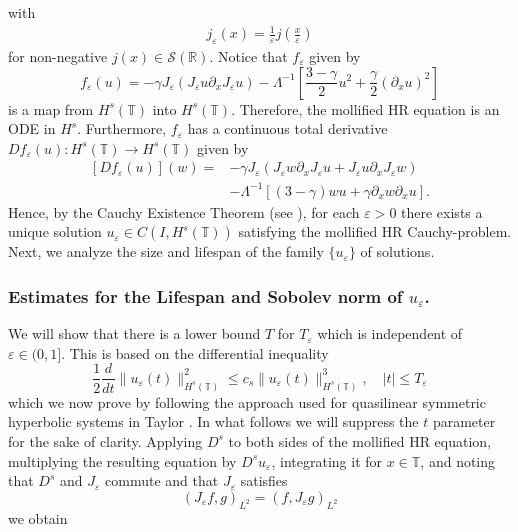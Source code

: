 \documentclass{beamer}
\newcommand{\rr}{\mathbb{R}}
\newcommand{\p}{\partial}
\newcommand{\ci}{\mathbb{T}}
\newcommand{\ee}{\varepsilon}
\begin{document}
\begin{frame}
with 
%
\begin{equation*}
\begin{split}
j_\ee(x) = \frac{1}{\ee}j\left( \frac{x}{\ee} \right)
\end{split}
\end{equation*}
%
for non-negative $j(x) \in
\mathcal{S}(\rr)$. Notice that  $f_\ee$ given by 
%
%
\begin{equation*}
\label{f_ep}
f_{\ee}(u) = - \gamma J_\ee(J_\varepsilon u \partial_x J_\varepsilon u)
- \Lambda^{-1} \left
[\frac{3-\gamma}{2}u^2 + \frac{\gamma}{2}(\p_x u)^2 \right ]
\end{equation*}
%
is a map from $H^s(\ci)$  into $H^s(\ci)$. 
Therefore, the mollified HR equation 
is an ODE in $H^s$.
%
%
Furthermore, $f_\ee$ has a continuous total derivative $D f_\ee (u): 
H^s(\ci) \to H^s(\ci)$ given by
\begin{equation*}
	\label{total-deriv}
	\begin{split}
		[Df_{\ee}(u)](w)
		=
		& -\gamma J_\ee (J_\varepsilon w \partial_x J_\varepsilon u +
		J_\varepsilon u \partial_x J_\varepsilon w)
		\\
		& - \Lambda^{-1} \left [(3-\gamma)w u + \gamma\p_x w \p_x u \right ].
	\end{split}
\end{equation*}
Hence, by the Cauchy Existence Theorem (see \cite{Dieudonne_1969_Foundations-of-}), for each 
$\ee > 0$ there exists a
unique solution $u_\ee \in C(I, H^s(\ci))$ satisfying the mollified HR 
Cauchy-problem.
Next, we analyze the size and
lifespan of the family $\{u_\ee\}$ of solutions.

\end{frame}
%
%
%
%

\begin{frame}
\frametitle{Estimates for the Lifespan and Sobolev norm of $u_\ee$.}
%
We will show that there is a lower bound  $T$
for $T_\ee$ which is independent of $\ee\in(0, 1]$.
This is based on the differential
inequality 
%
%
%
\begin{equation*} \label{B-diff-ineq}
\frac 12
\frac{d}{dt}
\|u_\ee(t)\|_{H^{s}(\ci)}^2
\le
c_s
\|u_\ee(t)\|_{H^{s}(\ci)}^3,
\quad
|t| \le T_\ee
\end{equation*}
%
%
%
%
which we now prove by
following the approach used for quasilinear symmetric
hyperbolic systems in Taylor  \cite{Taylor_1991_Pseudodifferent}. In what 
follows we will suppress the
$t$ parameter for the sake of clarity.
%
%
%
Applying $D^s$ to both sides of the mollified HR equation,
multiplying the resulting equation by $D^s u_\ee$,
integrating it for $x\in\ci$, and noting that 
$D^s$ and $J_\ee$ commute
and that  $J_\ee$ satisfies 
%
%
\begin{equation*} 
\label{J-e-inner-prod-property}
(J_\ee f, g)_{L^2}=( f, J_\ee g)_{L^2}
\end{equation*}
%
%
we obtain

\end{frame}
\end{document}
